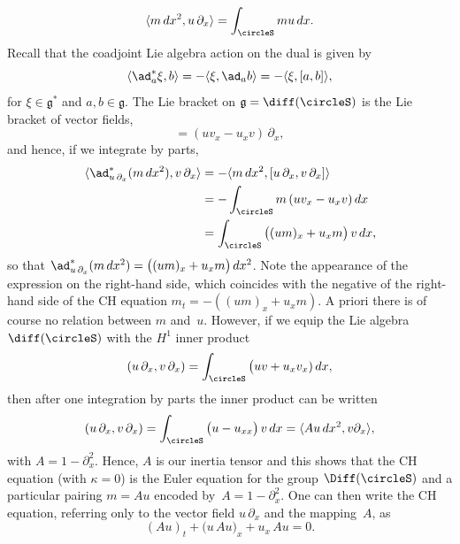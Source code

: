 \documentclass[10pt,a4paper]{article} \pdfoutput=1 
\begin{document}
\begin{equation*}
  \langle m \, dx^{2}, u \, \partial_x \rangle = \int_{\circleS} m u \, dx
  .
\end{equation*}
Recall that the coadjoint Lie algebra action on the dual is given by
\begin{equation}
  \label{eq:guide-coadjoint-action}
  \langle \ad_a^*\xi, b \rangle
  = - \langle \xi, \ad_a b \rangle
  = - \langle \xi, [a,b] \rangle
  ,
\end{equation}
for $\xi \in \mathfrak{g}^*$ and  $a,b \in \mathfrak{g}$.
The Lie bracket on $\mathfrak{g}=\diff(\circleS)$ is the Lie bracket of vector fields,
\begin{equation*}
  [u \, \partial _x , v \, \partial_x] = (uv_x-u_x v) \, \partial_x
  ,
\end{equation*}
and hence, if we integrate by parts,
\begin{equation*}
  \begin{split}
    \langle \ad_{u \, \partial_x}^* (m \, dx^2), v \, \partial_x \rangle
    &
    = - \langle m \, dx^2, [u \, \partial _x , v \, \partial_x] \rangle
    \\ &
    = - \int_{\circleS} m \, (u v_x - u_x v) \, dx
    \\ &
    = \int_{\circleS}\big( (u m)_x + u_x m \big) \, v \, dx
    ,
  \end{split}
\end{equation*}
so that
$\ad^*_{u \, \partial_x} (m \, dx^2) = \bigl( (um)_x + u_x m \bigr) \, dx^2$.
Note the appearance of the expression on the right-hand side,
which coincides with the negative of the right-hand side of the CH equation $m_t = -((um)_x + u_x m)$.
A priori there is of course no relation between $m$ and~$u$.
However, if we equip the Lie algebra $\diff(\circleS)$ with the $H^1$ inner product
\begin{equation*}
  (u \, \partial_x , v \,\partial_x) = \int_{\circleS} \big( uv + u_xv_x) \, dx
  ,
\end{equation*}
then after one integration by parts the inner product can be written
\begin{equation*}
  (u \, \partial_x , v \, \partial_x)
  = \int_{\circleS} \big( u-u_{xx}\big) \, v \, dx
  = \langle Au \, dx^2 , v \partial_x \rangle
  ,
\end{equation*}
with $A = 1-\partial_x^2$.
Hence, $A$ is our inertia tensor and this shows that the CH equation
(with $\kappa=0$)
is the Euler equation for the group $\Diff(\circleS)$
and a particular pairing $m=Au$ encoded by~$A = 1-\partial_x^2$.
One can then write the CH equation, referring only to the vector field $u \, \partial _x$
and the mapping~$A$, as
\begin{equation} \label{eq:ACH}
  (Au)_t + \bigl( u \, Au \bigr)_x + u_x \, Au = 0
  .
\end{equation}
\end{document}

